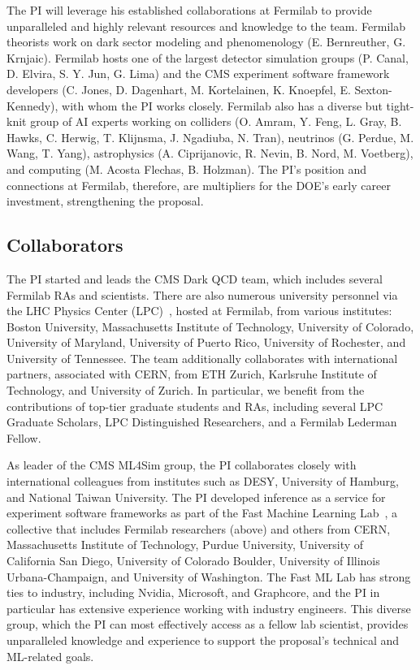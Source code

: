The PI will leverage his established collaborations at Fermilab to provide unparalleled and highly relevant resources and knowledge to the team.
Fermilab theorists work on dark sector modeling and phenomenology (E. Bernreuther, G. Krnjaic).
Fermilab hosts one of the largest detector simulation groups (P. Canal, D. Elvira, S. Y. Jun, G. Lima)
and the CMS experiment software framework developers (C. Jones, D. Dagenhart, M. Kortelainen, K. Knoepfel, E. Sexton-Kennedy), with whom the PI works closely.
Fermilab also has a diverse but tight-knit group of AI experts working on colliders (O. Amram, Y. Feng, L. Gray, B. Hawks, C. Herwig, T. Klijnsma, J. Ngadiuba, N. Tran),
neutrinos (G. Perdue, M. Wang, T. Yang), astrophysics (A. Ciprijanovic, R. Nevin, B. Nord, M. Voetberg), and computing (M. Acosta Flechas, B. Holzman).
The PI's position and connections at Fermilab, therefore, are multipliers for the DOE's early career investment, strengthening the proposal.

\subsection{Collaborators}\label{subsec:collab}

The PI started and leads the CMS Dark QCD team, which includes several Fermilab RAs and scientists.
There are also numerous university personnel via the LHC Physics Center (LPC)~\cite{LPC}, hosted at Fermilab, from various institutes:
Boston University, Massachusetts Institute of Technology, University of Colorado, University of Maryland, University of Puerto Rico, University of Rochester, and University of Tennessee.
The team additionally collaborates with international partners, associated with CERN, from ETH Zurich, Karlsruhe Institute of Technology, and University of Zurich.
In particular, we benefit from the contributions of top-tier graduate students and RAs, including several LPC Graduate Scholars, LPC Distinguished Researchers, and a Fermilab Lederman Fellow.

As leader of the CMS ML4Sim group, the PI collaborates closely with international colleagues from institutes such as DESY, University of Hamburg, and National Taiwan University.
The PI developed inference as a service for experiment software frameworks as part of the Fast Machine Learning Lab~\cite{FML},
a collective that includes Fermilab researchers (above)
and others from CERN, Massachusetts Institute of Technology, Purdue University, University of California San Diego, University of Colorado Boulder, University of Illinois Urbana-Champaign, and University of Washington.
The Fast ML Lab has strong ties to industry, including Nvidia, Microsoft, and Graphcore, and the PI in particular has extensive experience working with industry engineers.
This diverse group, which the PI can most effectively access as a fellow lab scientist,
provides unparalleled knowledge and experience to support the proposal's technical and ML-related goals.
